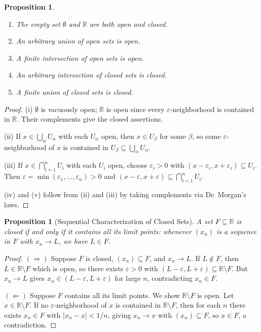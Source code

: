 \documentclass[11pt,a4paper]{article}
\theoremstyle{definition}
\theoremstyle{plain}
\newtheorem{proposition}[theorem]{Proposition}
\theoremstyle{remark}
\newcommand{\R}{\mathbb{R}}
\begin{document}
\begin{proposition}
\label{prop:open_closed_basics}
\begin{enumerate}[nosep,label=(\roman*)]
    \item The empty set $\emptyset$ and $\R$ are both open and closed.
    \item An arbitrary union of open sets is open.
    \item A finite intersection of open sets is open.
    \item An arbitrary intersection of closed sets is closed.
    \item A finite union of closed sets is closed.
\end{enumerate}
\end{proposition}

\begin{proof}
(i) $\emptyset$ is vacuously open; $\R$ is open since every $\varepsilon$-neighborhood
is contained in $\R$. Their complements give the closed assertions.

(ii) If $x \in \bigcup_\alpha U_\alpha$ with each $U_\alpha$ open, then $x \in U_\beta$
for some $\beta$, so some $\varepsilon$-neighborhood of $x$ is contained in $U_\beta
\subseteq \bigcup_\alpha U_\alpha$.

(iii) If $x \in \bigcap_{i=1}^n U_i$ with each $U_i$ open, choose $\varepsilon_i > 0$
with $(x - \varepsilon_i, x + \varepsilon_i) \subseteq U_i$. Then
$\varepsilon = \min(\varepsilon_1, \ldots, \varepsilon_n) > 0$ and
$(x - \varepsilon, x + \varepsilon) \subseteq \bigcap_{i=1}^n U_i$.

(iv) and (v) follow from (ii) and (iii) by taking complements via De~Morgan's laws.
\end{proof}

\begin{proposition}[Sequential Characterization of Closed Sets]
\label{prop:closed_seq}
A set $F \subseteq \R$ is closed if and only if it contains all its limit points:
whenever $(x_n)$ is a sequence in $F$ with $x_n \to L$, we have $L \in F$.
\end{proposition}

\begin{proof}
$(\Rightarrow)$ Suppose $F$ is closed, $(x_n) \subseteq F$, and $x_n \to L$.
If $L \notin F$, then $L \in \R \setminus F$ which is open, so there exists
$\varepsilon > 0$ with $(L - \varepsilon, L + \varepsilon) \subseteq \R \setminus F$.
But $x_n \to L$ gives $x_n \in (L - \varepsilon, L + \varepsilon)$ for large $n$,
contradicting $x_n \in F$.

$(\Leftarrow)$ Suppose $F$ contains all its limit points. We show $\R \setminus F$
is open. Let $x \in \R \setminus F$. If no $\varepsilon$-neighborhood of $x$ is
contained in $\R \setminus F$, then for each $n$ there exists $x_n \in F$ with
$|x_n - x| < 1/n$, giving $x_n \to x$ with $(x_n) \subseteq F$, so $x \in F$,
a contradiction.
\end{proof}
\end{document}
